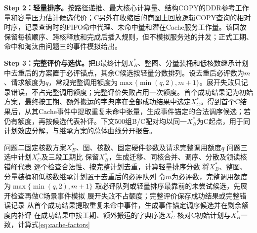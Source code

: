 \textbf{Step 2：轻量排序。}按路径递推、最大核心计算量、结构COPY的DDR参考工作量和容量压力估计候选代价；C另外在收缩后的商图上回放逻辑COPY查询的相对时序，记录查询时的FIFO命中代理、未命中量和潜在Cache服务工作量。该回放保留每核顺序、跨核释放和完成后插入规则，但不模拟服务池的并发；正式工期、命中和淘汰由问题三的事件模拟给出。

\textbf{Step 3：完整评价与选优。}把B最终计划$X_B^*$、整图、分量装桶和低核数继承计划中去重后的方案置于必评锚点，其余C候选按轻量分数排列。设去重后必评数为$m$、请求额度为$q$，常规完整调用额度为$\max\{\min(q,2),m+1\}$。展开失败只记录错误，不占完整调用额度；完整评价失败占用一次额度。首个成功结果记为初始方案，最终按工期、额外搬运的字典序在全部成功结果中选定$X_C^*$。得到首个C结果后，从其Cache事件中提取重复未命中张量，生成事件锚定的合法调序候选；若仍有额度，再按候选代表补评。下文500组B/C配对均以同一$X_B^*$为C起点，用于同计划效应分解，与继承方案的总体曲线分开报告。

\begin{algorithm}[H]\caption{问题三候选选择与同计划对照}\label{alg:c-select}
\begin{algorithmic}[1]
\REQUIRE 问题二固定核数方案$X_B^*$、图、核数、固定硬件参数及请求完整调用额度$q$
\ENSURE 问题三选中计划$X_C^*$及三段工期比
\STATE 保留$X_B^*$，生成迁移、同核合并、调序、分散及领读核错峰代表
\STATE 逐个检查合法性、按完整计划去重，计算轻量排序分数
\STATE 将$X_B^*$、整图、分量装桶和低核数继承计划置于去重后的必评队列
\STATE 令$m$为必评数，完整调用额度为$\max\{\min(q,2),m+1\}$
\STATE 取必评队列或轻量排序最靠前的未尝试候选，先展开检查再做C场景事件模拟
\STATE 展开失败不占额度；完整评价保存成功结果或完整错误记录
\ENDWHILE
\STATE 从首个成功结果提取重复未命中事件，生成事件锚定调序候选并在剩余额度内补评
\STATE 在成功结果中按工期、额外搬运的字典序选$X_C^*$
\STATE 核对C初始计划与$X_B^*$一致，计算式\eqref{eq:cache-factors}
\end{algorithmic}\end{algorithm}

